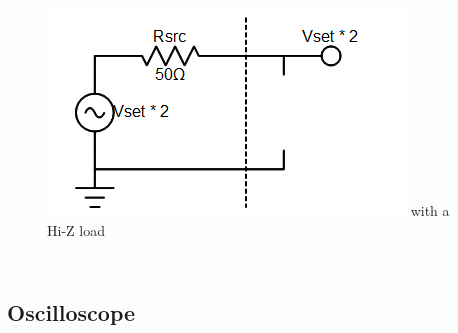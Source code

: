 \documentclass{beamer}
\begin{document}
\begin{frame}
\begin{columns}[t]
\begin{figure}
  \includegraphics[width=0.75\columnwidth]{images-dis2/funcgen-hiz} \newline
  with a Hi-Z load
\end{figure}
\end{columns}
\end{frame}

\subsection{Oscilloscope}
\end{document}
